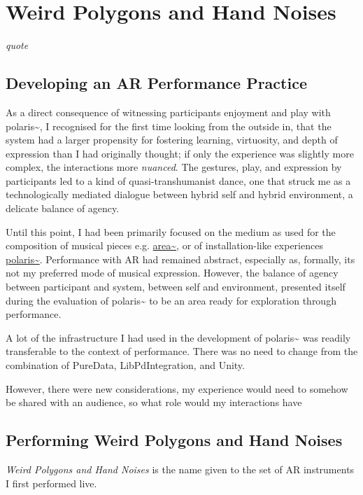 \chapter{Weird Polygons and Hand Noises}
\label{sec: performance}
\epigraph{\emph{quote}}{\citep[]{bilbow2022}}



\section{Developing an AR Performance Practice} \label{sec: performance-developing}
As a direct consequence of witnessing participants enjoyment and play with polaris\textasciitilde{}, I recognised for the first time looking from the outside in, that the system had a larger propensity for fostering learning, virtuosity, and depth of expression than I had originally thought; if only the experience was slightly more complex, the interactions more \textit{nuanced}. The gestures, play, and expression by participants led to a kind of quasi-transhumanist dance, one that struck me as a technologically mediated dialogue between hybrid self and hybrid environment, a delicate balance of agency.

Until this point, I had been primarily focused on the medium as used for the composition of musical pieces e.g. \hyperref[sec: area]{area\textasciitilde{}}, or of installation-like experiences \hyperref[sec: polaris]{polaris\textasciitilde{}}. Performance with AR had remained abstract, especially as, formally, its not my preferred mode of musical expression. However, the balance of agency between participant and system, between self and environment, presented itself during the evaluation of polaris\textasciitilde{} to be an area ready for exploration through performance.

A lot of the infrastructure I had used in the development of polaris\textasciitilde{} was readily transferable to the context of performance. There was no need to change from the combination of PureData, LibPdIntegration, and Unity.

However, there were new considerations, my experience would need to somehow be shared with an audience, so what role would my interactions have


\section{Performing Weird Polygons and Hand Noises} \label{sec: performance-experience}
\textit{Weird Polygons and Hand Noises} is the name given to the set of AR instruments I first performed live.

